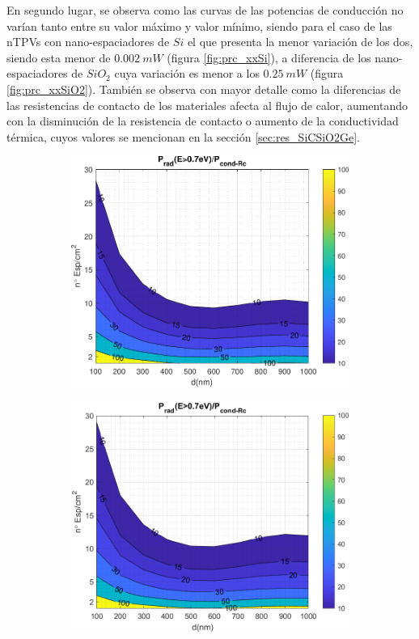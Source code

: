 En segundo lugar, se observa como las curvas de las potencias de conducción no varían tanto entre su valor máximo y valor mínimo, siendo para el caso de las nTPVs con nano-espaciadores de $Si$ el que presenta la menor variación de los dos, siendo esta menor de $0.002 \ mW$ (figura \ref{fig:prc_xxSi}), a diferencia de los nano-espaciadores de $SiO_2$ cuya variación es menor a los $0.25 \ mW$ (figura \ref{fig:prc_xxSiO2}). También se observa con mayor detalle como la diferencias de las resistencias de contacto de los materiales afecta al flujo de calor, aumentando con la disminución de la resistencia de contacto o aumento de la conductividad térmica, cuyos valores se mencionan en la sección \ref{sec:res_SiCSiO2Ge}.
\begin{figure} [H]%
	\centering
	\begin{subfigure}[b]{0.48\textwidth}%
			\includegraphics[width=\columnwidth]{rel_SiC}%
			\caption{}%
			\label{fig:prc_SiCSi}%
	\end{subfigure}
	\hfill
	\begin{subfigure}[b]{0.48\textwidth}%
			\includegraphics[width=\columnwidth]{SiC_Rc}%

\end{subfigure}
\end{figure}
